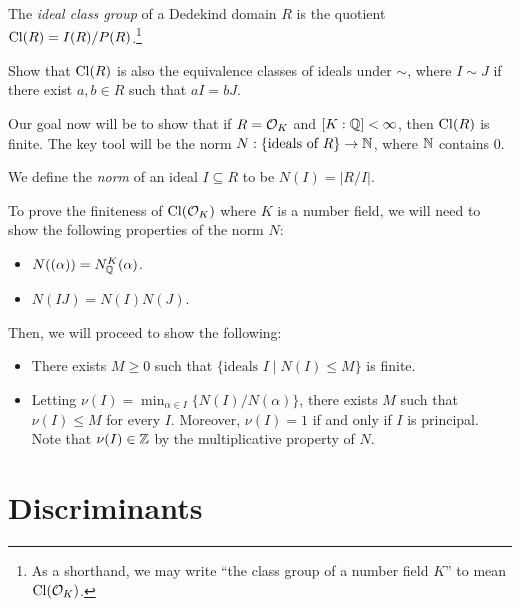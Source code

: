 \begin{definition}
  The \emph{ideal class group} of a Dedekind domain $R$
  is 
  the quotient $\operatorname{Cl}(R) = I(R) / P(R)$.\footnote{As a shorthand, we may write ``the class group of
  a number field $K$'' to mean $\operatorname{Cl}(\mathcal{O}_K)$.}
\end{definition}

\begin{exercise}
  Show that $\operatorname{Cl}(R)$ is also the equivalence classes
  of ideals under $\sim$, where $I \sim J$ if
  there exist $a, b \in R$ such that $aI = bJ$.
\end{exercise}


\begin{remark}
  Our goal now will be to show that if $R = \mathcal{O}_K$
  and $[K : \mathbb{Q}] < \infty$, then $\operatorname{Cl}(R)$ is finite.
  The key tool will be the norm
  $N : \{\text{ideals of $R$}\} \to \mathbb{N}$, where
  $\mathbb{N}$ contains $0$.
\end{remark}

\begin{definition}
  We define the \emph{norm} of an ideal $I \subseteq R$
  to be $N(I) = |R/I|$.
\end{definition}

\begin{remark}
  To prove the finiteness of $\operatorname{Cl}(\mathcal{O}_K)$ where
  $K$ is a number field,
  we will need to show the following properties of the
  norm $N$:
  \begin{itemize}
    \item $N((\alpha)) = N^{K}_{\mathbb{Q}}(\alpha)$.
    \item $N(IJ) = N(I) N(J)$.
  \end{itemize}
  Then, we will proceed to show the following:
  \begin{itemize}
    \item There exists $M \ge 0$ such that
      $\{\text{ideals } I \mid N(I) \le M\}$ is finite.
    \item Letting $\nu(I) = \min_{\alpha \in I} \{N(I) / N(\alpha)\}$,
      there exists $M$ such that
      $\nu(I) \le M$ for every $I$.
      Moreover, $\nu(I) = 1$ if and only if
      $I$ is principal.
      Note that
      $\nu(I) \in \mathbb{Z}$ by the multiplicative property
      of $N$.
  \end{itemize}
\end{remark}

\section{Discriminants}

